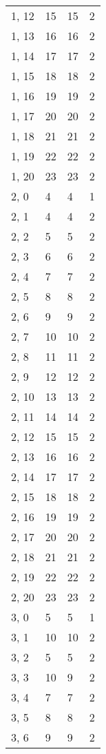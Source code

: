 \begin{table}
\begin{tabular}{llll}
1, 12  &   15 &   15 &     2 \\
1, 13  &   16 &   16 &     2 \\
1, 14  &   17 &   17 &     2 \\
1, 15  &   18 &   18 &     2 \\
1, 16  &   19 &   19 &     2 \\
1, 17  &   20 &   20 &     2 \\
1, 18  &   21 &   21 &     2 \\
1, 19  &   22 &   22 &     2 \\
1, 20  &   23 &   23 &     2 \\
2, 0   &    4 &    4 &     1 \\
2, 1   &    4 &    4 &     2 \\
2, 2   &    5 &    5 &     2 \\
2, 3   &    6 &    6 &     2 \\
2, 4   &    7 &    7 &     2 \\
2, 5   &    8 &    8 &     2 \\
2, 6   &    9 &    9 &     2 \\
2, 7   &   10 &   10 &     2 \\
2, 8   &   11 &   11 &     2 \\
2, 9   &   12 &   12 &     2 \\
2, 10  &   13 &   13 &     2 \\
2, 11  &   14 &   14 &     2 \\
2, 12  &   15 &   15 &     2 \\
2, 13  &   16 &   16 &     2 \\
2, 14  &   17 &   17 &     2 \\
2, 15  &   18 &   18 &     2 \\
2, 16  &   19 &   19 &     2 \\
2, 17  &   20 &   20 &     2 \\
2, 18  &   21 &   21 &     2 \\
2, 19  &   22 &   22 &     2 \\
2, 20  &   23 &   23 &     2 \\
3, 0   &    5 &    5 &     1 \\
3, 1   &   10 &   10 &     2 \\
3, 2   &    5 &    5 &     2 \\
3, 3   &   10 &    9 &     2 \\
3, 4   &    7 &    7 &     2 \\
3, 5   &    8 &    8 &     2 \\
3, 6   &    9 &    9 &     2 \\

\end{tabular}
\end{table}
